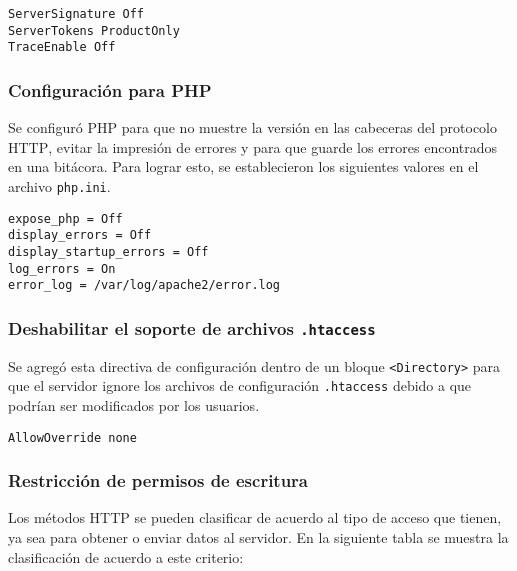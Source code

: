{
\scriptsize
\linespread{1}
\begin{verbatim}
ServerSignature Off
ServerTokens ProductOnly
TraceEnable Off
\end{verbatim}
}

        \subsubsection{Configuraci\'{o}n para \textsc{PHP}}

Se configur\'{o} \textsc{PHP} para que no muestre la versi\'{o}n en las cabeceras del protocolo \textsc{HTTP}, evitar la impresi\'{o}n de errores y para que guarde los errores encontrados en una bit\'{a}cora. Para lograr esto, se establecieron los siguientes valores en el archivo \texttt{php.ini}.

{
\scriptsize
\linespread{1}
\begin{verbatim}
expose_php = Off
display_errors = Off
display_startup_errors = Off
log_errors = On
error_log = /var/log/apache2/error.log
\end{verbatim}
}

        \subsubsection{Deshabilitar el soporte de archivos \texttt{.htaccess}}

Se agreg\'{o} esta directiva de configuraci\'{o}n dentro de un bloque \texttt{<Directory>} para que el servidor ignore los archivos de configuraci\'{o}n \texttt{.htaccess} debido a que podr\'{i}an ser modificados por los usuarios.

{
\scriptsize
\linespread{1}
\begin{verbatim}
AllowOverride none
\end{verbatim}
}

        \subsubsection{Restricci\'{o}n de permisos de escritura}

Los m\'{e}todos \textsc{HTTP} se pueden clasificar de acuerdo al tipo de acceso que tienen, ya sea para obtener o enviar datos al servidor. En la siguiente tabla se muestra la clasificaci\'{o}n de acuerdo a este criterio:

